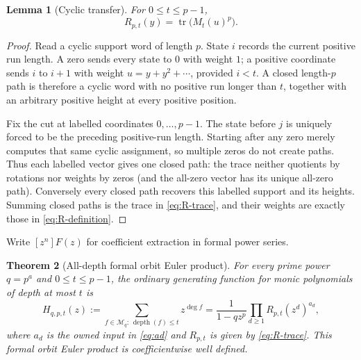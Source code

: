 \documentclass[10pt,a4paper]{amsart}
\newtheorem{theorem}{Theorem}[section]
\newtheorem{lemma}[theorem]{Lemma}
\theoremstyle{definition}
\theoremstyle{remark}
\newcommand{\Mon}{\mathcal M}
\newcommand{\depth}{\operatorname{depth}}
\begin{document}
\begin{lemma}[Cyclic transfer]\label{lem:transfer}
For $0\leq t\leq p-1$,
\begin{equation}\label{eq:R-trace}
                         R_{p,t}(y)=\operatorname{tr}\bigl(M_t(u)^p\bigr).
\end{equation}
\end{lemma}

\begin{proof}
Read a cyclic support word of length $p$.  State $i$ records the current
positive run length.  A zero sends every state to $0$ with weight $1$; a
positive coordinate sends $i$ to $i+1$ with weight
$u=y+y^2+\cdots$, provided $i<t$.  A closed length-$p$ path is therefore a
cyclic word with no positive run longer than $t$, together with an arbitrary
positive height at every positive position.

Fix the cut at labelled coordinates $0,\ldots,p-1$.  The state before $j$
is uniquely forced to be the preceding positive-run length.  Starting after
any zero merely computes that same cyclic assignment, so multiple zeros do
not create paths.  Thus each labelled vector gives one closed path: the
trace neither quotients by rotations nor weights by zeros (and the all-zero
vector has its unique all-zero path).  Conversely every closed path recovers
this labelled support and its heights.  Summing closed paths is the trace in
\eqref{eq:R-trace}, and their weights are exactly those in
\eqref{eq:R-definition}.
\end{proof}

Write $[z^n]F(z)$ for coefficient extraction in formal power series.

\begin{theorem}[All-depth formal orbit Euler product]\label{thm:euler}
For every prime power $q=p^a$ and $0\leq t\leq p-1$, the ordinary
generating function for monic polynomials of depth at most $t$ is
\begin{equation}\label{eq:H}
 H_{q,p,t}(z)
 :=\sum_{f\in\Mon_q:\,\depth(f)\leq t}z^{\deg f}
 =\frac{1}{1-qz^p}
   \prod_{d\geq1}R_{p,t}(z^d)^{a_d},
\end{equation}
where $a_d$ is the owned input in \eqref{eq:ad} and $R_{p,t}$ is given by
\eqref{eq:R-trace}.  This formal orbit Euler product is coefficientwise well
defined.
\end{theorem}
\end{document}
